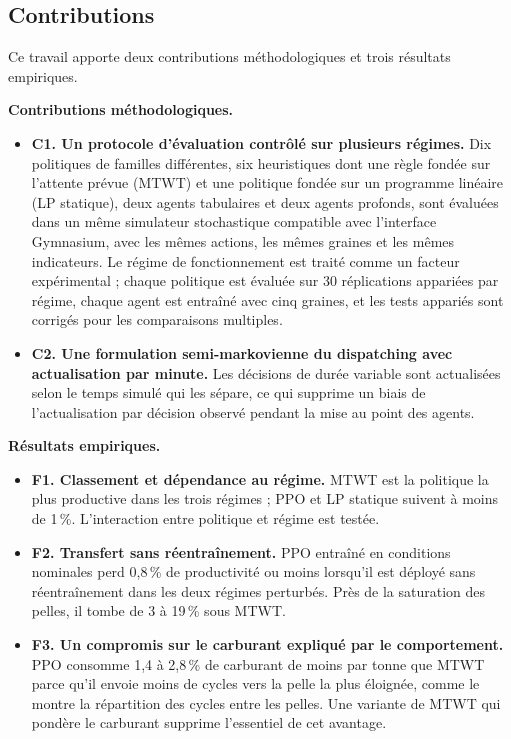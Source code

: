 \documentclass[11pt,a4paper]{article}
\newif\ifrevmarks
\newcommand{\revtag}[1]{\ifrevmarks\textsuperscript{\textcolor{red!70!black}{\scriptsize[#1]}}\fi}
\newenvironment{revbloc}[1]{\par\ifrevmarks\color{revcolor}\noindent\revtag{#1}\ \fi}{\par}
\newif\ifcorrmarks
\newcommand{\corr}[1]{\ifcorrmarks\textcolor{corrcolor}{#1}\else#1\fi}
\newenvironment{corrbloc}{\par\ifcorrmarks\color{corrcolor}\fi}{\par}
\begin{document}
\subsection{Contributions}

\begin{revbloc}{M23, M24, M26, M16}
\begin{corrbloc}
Ce travail apporte deux contributions méthodologiques et trois résultats empiriques.

\noindent\textbf{Contributions méthodologiques.}
\begin{itemize}
  \item \textbf{C1. Un protocole d'évaluation contrôlé sur plusieurs régimes.} Dix politiques de familles différentes, six heuristiques dont une règle fondée sur l'attente prévue (MTWT) et une politique fondée sur un programme linéaire (\corr{LP statique}), deux agents tabulaires et deux agents profonds, sont évaluées dans un même simulateur stochastique compatible avec l'interface Gymnasium, avec les mêmes actions, les mêmes graines et les mêmes indicateurs. Le régime de fonctionnement est traité comme un facteur expérimental ; chaque politique est évaluée sur 30 réplications appariées par régime, chaque agent est entraîné avec cinq graines, et les tests appariés sont corrigés pour les comparaisons multiples.
  \item \textbf{C2. Une formulation semi-markovienne du dispatching avec actualisation par minute.} Les décisions de durée variable sont actualisées selon le temps simulé qui les sépare, ce qui supprime un biais de l'actualisation par décision observé pendant la mise au point des agents.
\end{itemize}

\noindent\textbf{Résultats empiriques.}
\begin{itemize}
  \item \textbf{F1. Classement et dépendance au régime.} MTWT est la politique la plus productive dans les trois régimes ; PPO et \corr{LP statique} suivent à moins de 1\,\%. L'interaction entre politique et régime est testée.
  \item \textbf{F2. Transfert sans réentraînement.} PPO entraîné en conditions nominales perd 0,8\,\% de productivité ou moins lorsqu'il est déployé sans réentraînement dans les deux régimes perturbés. \corr{Près de la saturation des pelles, il tombe de 3 à 19\,\% sous MTWT.}
  \item \textbf{F3. Un compromis sur le carburant expliqué par le comportement.} PPO consomme 1,4 à 2,8\,\% de carburant de moins par tonne que MTWT parce qu'il envoie moins de cycles vers la pelle la plus éloignée, comme le montre la répartition des cycles entre les pelles. \corr{Une variante de MTWT qui pondère le carburant supprime l'essentiel de cet avantage.}
\end{itemize}
\end{corrbloc}
\end{revbloc}
\end{document}
